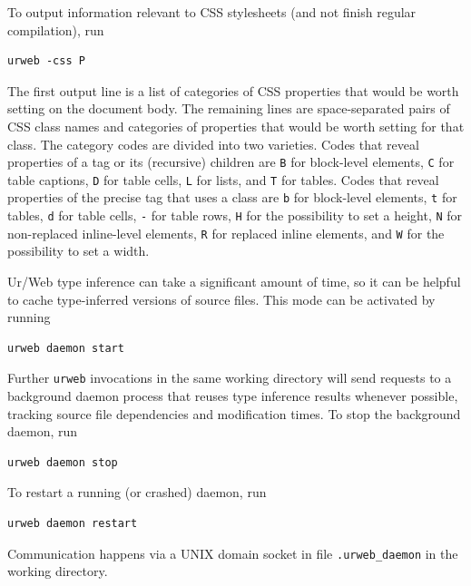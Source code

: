 \documentclass{article}
\newcommand{\cd}[1]{\texttt{#1}}
\begin{document}
To output information relevant to CSS stylesheets (and not finish regular compilation), run
\begin{verbatim}
urweb -css P
\end{verbatim}
The first output line is a list of categories of CSS properties that would be worth setting on the document body.  The remaining lines are space-separated pairs of CSS class names and categories of properties that would be worth setting for that class.  The category codes are divided into two varieties.  Codes that reveal properties of a tag or its (recursive) children are \cd{B} for block-level elements, \cd{C} for table captions, \cd{D} for table cells, \cd{L} for lists, and \cd{T} for tables.  Codes that reveal properties of the precise tag that uses a class are \cd{b} for block-level elements, \cd{t} for tables, \cd{d} for table cells, \cd{-} for table rows, \cd{H} for the possibility to set a height, \cd{N} for non-replaced inline-level elements, \cd{R} for replaced inline elements, and \cd{W} for the possibility to set a width.

Ur/Web type inference can take a significant amount of time, so it can be helpful to cache type-inferred versions of source files.  This mode can be activated by running
\begin{verbatim}
urweb daemon start
\end{verbatim}
Further \cd{urweb} invocations in the same working directory will send requests to a background daemon process that reuses type inference results whenever possible, tracking source file dependencies and modification times.  To stop the background daemon, run
\begin{verbatim}
urweb daemon stop
\end{verbatim}
To restart a running (or crashed) daemon, run
\begin{verbatim}
urweb daemon restart
\end{verbatim}
Communication happens via a UNIX domain socket in file \cd{.urweb\_daemon} in the working directory.
\end{document}
